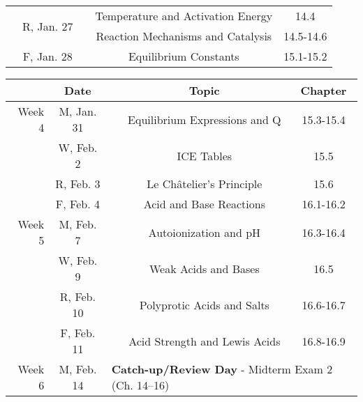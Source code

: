 \documentclass[12pt, letterpaper]{article}
\begin{document}
\begin{tabular}{rcccc}
	       & \multirow{2}{*}{R, Jan. 27} &                                                                                & Temperature and Activation Energy           & 14.4      \\
	       &                             &                                                                                & Reaction Mechanisms and Catalysis           & 14.5-14.6 \\
	       & F, Jan. 28                  &                                                                                & Equilibrium Constants                       & 15.1-15.2 \\
\end{tabular}

\begin{tabular}{rcccc}
	       & Date       &                                                                                & Topic                           & Chapter    \\
	\midrule
	Week 4 & M, Jan. 31 &                                                                                & Equilibrium Expressions and Q   & 15.3-15.4  \\
	       & W, Feb. 2  &                                                                                & ICE Tables                      & 15.5       \\
	       & R, Feb. 3  &                                                                                & Le Ch\^atelier's Principle      & 15.6       \\
	       & F, Feb. 4  &                                                                                & Acid and Base Reactions         & 16.1-16.2  \\
	\midrule
	Week 5 & M, Feb. 7  &                                                                                & Autoionization and pH           & 16.3-16.4  \\
	       & W, Feb. 9  &                                                                                & Weak Acids and Bases            & 16.5       \\
	       & R, Feb. 10 &                                                                                & Polyprotic Acids and Salts      & 16.6-16.7  \\
	       & F, Feb. 11 &                                                                                & Acid Strength and Lewis Acids   & 16.8-16.9  \\
	\midrule
	Week 6 & M, Feb. 14 & \multicolumn{3}{l}{\textbf{Catch-up/Review Day} - Midterm Exam 2 (Ch. 14--16)}                                                \\

\end{tabular}
\end{document}
